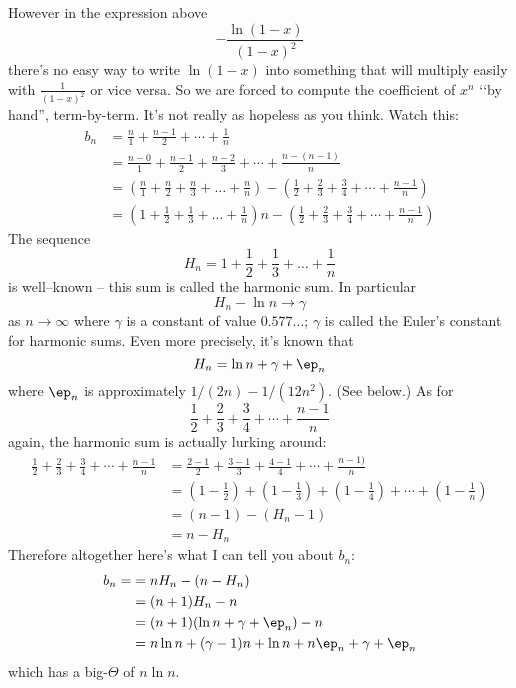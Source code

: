 However in the expression above
\[
-\frac{\ln (1-x)}{(1-x)^2}
\]
there's no easy way to write $\ln (1-x)$ into something that will multiply
easily with $\frac{1}{(1-x)^2}$ or vice versa.
So we are forced to compute the coefficient of $x^n$ \lq\lq by hand'', term-by-term.
It's not really as hopeless as you think.
Watch this:
\begin{align*}
b_n
&= \frac{n}{1} + \frac{n-1}{2} + \cdots + \frac{1}{n}
\\
&= \frac{n - 0}{1} + \frac{n - 1}{2} + \frac{n - 2}{3} + \cdots +
   \frac{n - (n-1)}{n} \\
&= \left(
   \frac{n}{1} + \frac{n}{2} + \frac{n}{3} + \ldots + \frac{n}{n}
   \right)
   -
   \left( \frac{1}{2} + \frac{2}{3} + \frac{3}{4} + \cdots + \frac{n-1}{n}
   \right)
   \\   
&= \left(
   {1} + \frac{1}{2} + \frac{1}{3} + \ldots + \frac{1}{n}
   \right) n
   -
   \left( \frac{1}{2} + \frac{2}{3} + \frac{3}{4} + \cdots + \frac{n-1}{n}
   \right)
\end{align*}
The sequence
\[
H_n = 1 + \frac{1}{2} + \frac{1}{3} + \ldots + \frac{1}{n}
\]
is well--known -- this sum is called the harmonic sum.
In particular
\[
H_n - \ln n \rightarrow \gamma
\]
as $n \rightarrow \infty$
where $\gamma$ is a constant of value $0.577...$;
$\gamma$ is called the Euler's constant for harmonic sums.
Even more precisely, it's known that
\[
H_n = \ln n + \gamma + \ep_n
\]
where $\ep_n$ is approximately $1/(2n) - 1/(12n^2)$.
(See below.)
As for
\[
\frac{1}{2} + \frac{2}{3} + \frac{3}{4} + \cdots + \frac{n-1}{n}
\]
again, the harmonic sum is actually lurking around:
\begin{align*}
\frac{1}{2} + \frac{2}{3} + \frac{3}{4} + \cdots + \frac{n-1}{n}
&= \frac{2-1}{2} + \frac{3-1}{3} + \frac{4-1}{4} + \cdots + \frac{n - 1)}{n}\\
&=
\left( 1 - \frac{1}{2} \right)
+ \left( 1 - \frac{1}{3} \right)
+ \left( 1 - \frac{1}{4} \right)
+ \cdots
+ \left( 1 - \frac{1}{n} \right)
\\
&= (n - 1) - (H_n - 1) \\
&= n - H_n
\end{align*}
Therefore altogether here's what I can tell you about $b_n$:
\begin{align*}
  b_n =
&= n H_n - (n - H_n) \\
&= (n + 1) H_n - n \\
&= (n + 1) (\ln n + \gamma + \ep_n) - n \\
&= n \ln n + (\gamma - 1) n + \ln n + n \ep_n + \gamma + \ep_n
\end{align*}
which has a big-$\Theta$ of $n\ln n$.

